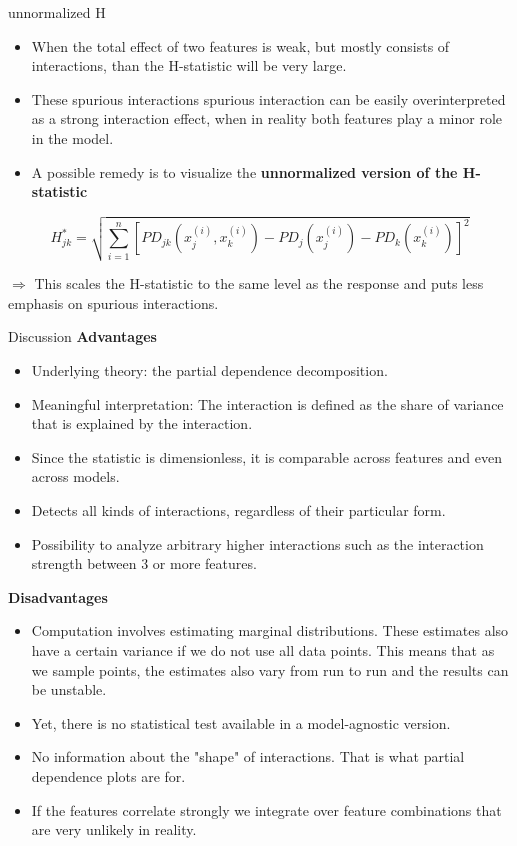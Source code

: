 \documentclass[11pt,compress,t,notes=noshow, aspectratio=169, xcolor=table]{beamer}
\begin{document}
\begin{vbframe} {unnormalized H}
\begin{itemize}
    \item When the total effect of two features is weak, but mostly consists of interactions, than the H-statistic will be very large.
    \item These spurious interactions spurious interaction can be easily overinterpreted as a strong interaction effect, when in reality both features play a minor role in the model.
    \item A possible remedy is to visualize the \textbf{unnormalized version of the H-statistic}
\end{itemize}

$$
H_{j k}^{*}=\sqrt{\sum_{i=1}^{n}\left[P D_{j k}\left(x_{j}^{(i)}, x_{k}^{(i)}\right)-P D_{j}\left(x_{j}^{(i)}\right)-P D_{k}\left(x_{k}^{(i)}\right)\right]^{2}}
$$

$\Rightarrow$ This scales the H-statistic to the same level as the response and puts less emphasis on spurious interactions.
\end{vbframe}

\begin{vbframe}{Discussion}
\textbf{Advantages}
\begin{itemize}
    \item Underlying theory: the partial dependence decomposition.
    \item Meaningful interpretation: The interaction is defined as the share of variance that is explained by the interaction.
    \item Since the statistic is dimensionless, it is comparable across features and even across models.
    \item Detects all kinds of interactions, regardless of their particular form.
    \item Possibility to analyze arbitrary higher interactions such as the interaction strength between 3 or more features.
\end{itemize}

\textbf{Disadvantages}
\begin{itemize}
    \item Computation involves estimating marginal distributions. These estimates also have a certain variance if we do not use all data points. This means that as we sample points, the estimates also vary from run to run and the results can be unstable.
    \item Yet, there is no statistical test available in a model-agnostic version.
    \item No information about the "shape" of interactions. That is what partial dependence plots are for.
    \item If the features correlate strongly we integrate over feature combinations that are very unlikely in reality.
\end{itemize}

	

\end{vbframe}

\endlecture
\end{document}
